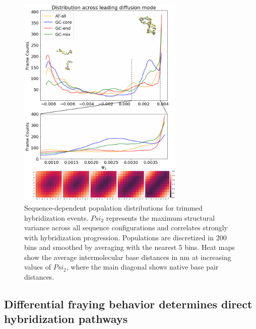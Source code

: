 \documentclass[journal=jpcbfk,manuscript=article]{achemso}
\begin{document}
\begin{figure}[ht!]
	\begin{center}
        \includegraphics[width=300, scale=1]{Fig9.pdf}
        \caption{Sequence-dependent population distributions for trimmed hybridization events. $Psi_2$ represents the maximum structural variance across all sequence configurations and correlates strongly with hybridization progression. Populations are discretized in 200 bins and smoothed by averaging with the nearest 5 bins. Heat maps show the average intermolecular base distances in nm at increasing values of $Psi_2$, where the main diagonal shows native base pair distances.}
        \label{fig:Fig9}
	\end{center}
\end{figure}

\subsection{Differential fraying behavior determines direct hybridization pathways} 
\end{document}
